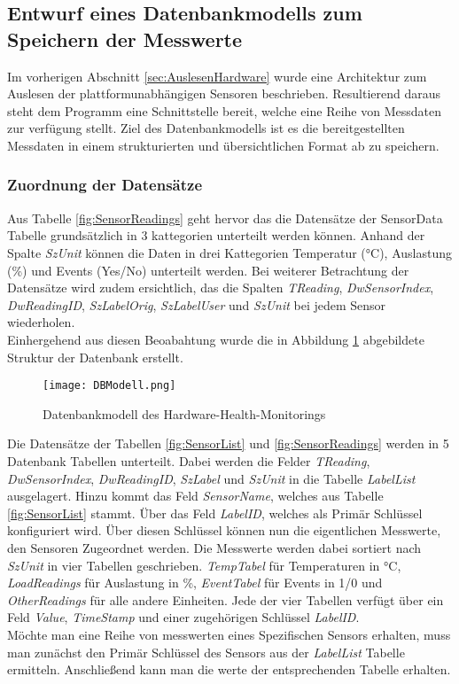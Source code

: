 \subsection{Entwurf eines Datenbankmodells zum Speichern der Messwerte}
Im vorherigen Abschnitt \ref{sec:AuslesenHardware} wurde eine Architektur zum Auslesen der plattformunabhängigen Sensoren beschrieben. Resultierend daraus steht dem Programm eine Schnittstelle bereit, welche eine Reihe von Messdaten zur verfügung stellt. Ziel des Datenbankmodells ist es die bereitgestellten Messdaten in einem strukturierten und übersichtlichen Format ab zu speichern.\\
\subsubsection*{Zuordnung der Datensätze}
Aus Tabelle \ref{fig:SensorReadings} geht hervor das die Datensätze der SensorData Tabelle grundsätzlich in 3 kattegorien unterteilt werden können. Anhand der Spalte \textit{SzUnit} können die Daten in drei Kattegorien Temperatur (°C), Auslastung (\%) und Events (Yes/No) unterteilt werden. Bei weiterer Betrachtung der Datensätze wird zudem ersichtlich, das die Spalten \textit{TReading}, \textit{DwSensorIndex}, \textit{DwReadingID}, \textit{SzLabelOrig}, \textit{SzLabelUser} und \textit{SzUnit} bei jedem Sensor wiederholen.\\
Einhergehend aus diesen Beoabahtung wurde die in Abbildung \ref{fig:DBModell} abgebildete Struktur der Datenbank erstellt. 
\begin{center}
    \begin{figure}[h!]
        \centering
        \texttt{[image: DBModell.png]}
        \caption{Datenbankmodell des Hardware-Health-Monitorings}
        \label{fig:DBModell}
    \end{figure}
\end{center}
\vspace{-1.8cm}
Die Datensätze der Tabellen \ref{fig:SensorList} und \ref{fig:SensorReadings} werden in 5 Datenbank Tabellen unterteilt. Dabei werden die Felder \textit{TReading}, \textit{DwSensorIndex}, \textit{DwReadingID}, \textit{SzLabel} und \textit{SzUnit} in die Tabelle \textit{LabelList} ausgelagert. Hinzu kommt das Feld \textit{SensorName}, welches aus Tabelle \ref{fig:SensorList} stammt. Über das Feld \textit{LabelID}, welches als Primär Schlüssel konfiguriert wird. Über diesen Schlüssel können nun die eigentlichen Messwerte, den Sensoren Zugeordnet werden. Die Messwerte werden dabei sortiert nach \textit{SzUnit} in vier Tabellen geschrieben. \textit{TempTabel} für Temperaturen in  °C, \textit{LoadReadings} für Auslastung in \%, \textit{EventTabel} für Events in 1/0 und \textit{OtherReadings} für alle andere Einheiten. Jede der vier Tabellen verfügt über ein Feld \textit{Value}, \textit{TimeStamp} und einer zugehörigen Schlüssel \textit{LabelID}.\\
Möchte man eine Reihe von messwerten eines Spezifischen Sensors erhalten, muss man zunächst den Primär Schlüssel des Sensors aus der \textit{LabelList} Tabelle ermitteln. Anschließend kann man die werte der entsprechenden Tabelle erhalten.
